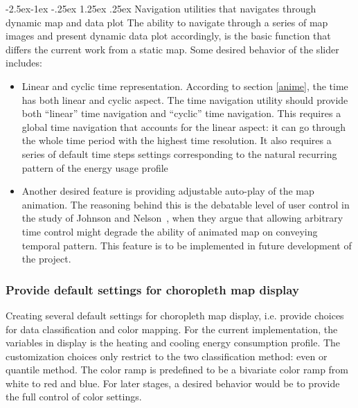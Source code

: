 \documentclass[hidelinks,12pt]{article}
\makeatletter
\renewcommand\paragraph{\@startsection{paragraph}{4}{\z@}%
            {-2.5ex\@plus -1ex \@minus -.25ex}%
            {1.25ex \@plus .25ex}%
            {\normalfont\normalsize\bfseries}}
\makeatother
\begin{document}
\paragraph{Navigation utilities that navigates through dynamic map
  and data plot}
The ability to navigate through a series of map images and present
dynamic data plot accordingly, is the basic function that differs
the current work from a static map. Some desired behavior of the
slider includes:
\begin{itemize}
\item Linear and cyclic time representation. According to section
  \ref{anime}, the time has both linear and cyclic aspect. The time
  navigation utility should provide both ``linear'' time navigation
  and ``cyclic'' time navigation. This requires a global time
  navigation that accounts for the linear aspect: it can go through
  the whole time period with the highest time resolution. It also
  requires a series of default time steps settings corresponding to
  the natural recurring pattern of the energy usage profile
\item Another desired feature is providing adjustable auto-play of the
  map animation. The reasoning behind this is the debatable level of
  user control in the study of Johnson and Nelson~\cite{Nelson1998},
  when they argue that allowing arbitrary time control might degrade
  the ability of animated map on conveying temporal pattern. This
  feature is to be implemented in future development of the project.
\end{itemize}

\subsubsection{Provide default settings for choropleth map display}
Creating several default settings for choropleth map display,
i.e. provide choices for data classification and color mapping. For
the current implementation, the variables in display is the heating
and cooling energy consumption profile. The customization choices only
restrict to the two classification method: even or quantile
method. The color ramp is predefined to be a bivariate color ramp from
white to red and blue. For later stages, a desired behavior would be
to provide the full control of color settings.
\end{document}

